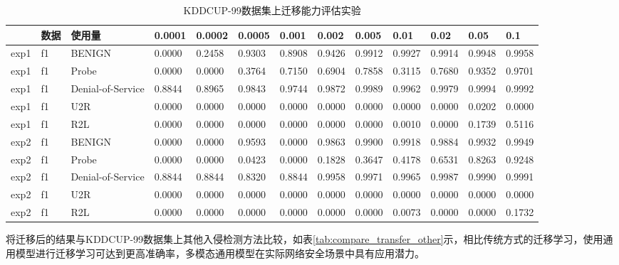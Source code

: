\begin{table}[htbp]
\caption{KDDCUP-99数据集上迁移能力评估实验}
    \centering
    \begin{adjustbox}{max width=\textwidth}
    \begin{tabular}{lllllllllllll}
    \toprule
        ~ & 数据& 使用量& 0.0001 &  0.0002&0.0005& 0.001& 0.002 & 0.005 & 0.01 & 0.02 & 0.05 & 0.1 \\ \midrule
        exp1 & f1& BENIGN& 0.0000 &  0.2458 &0.9303 & 0.8908 & 0.9426 & 0.9912 & 0.9927 & 0.9914 & 0.9948 & 0.9958 
\\ 
        exp1 & f1& Probe& 0.0000 &  0.0000 &0.3764 & 0.7150 & 0.6904 & 0.7858 & 0.3115 & 0.7680 & 0.9352 & 0.9701 
\\
 exp1 & f1& Denial-of-Service& 0.8844 & 0.8965 & 0.9843 & 0.9744 & 0.9872 & 0.9989 & 0.9962 & 0.9979 & 0.9994 &0.9992 
\\
 exp1 & f1& U2R& 0.0000 & 0.0000 & 0.0000 & 0.0000 & 0.0000 & 0.0000 & 0.0000 & 0.0000 & 0.0202 &0.0000 
\\
 exp1 & f1
& R2L& 0.0000 & 0.0000 & 0.0000 & 0.0000 & 0.0000 & 0.0000 & 0.0010 & 0.0000 & 0.1739 &0.5116 
\\
 exp2 & f1& BENIGN& 0.0000 & 0.0000 & 0.9593 & 0.0000 & 0.9863 & 0.9900 & 0.9918 & 0.9884 & 0.9932 &0.9949 
\\
 exp2 & f1
& Probe& 0.0000 & 0.0000 & 0.0423 & 0.0000 & 0.1828 & 0.3647 & 0.4178 & 0.6531 & 0.8263 &0.9248 
\\
 exp2 & f1
& Denial-of-Service& 0.8844 & 0.8844 & 0.8320 & 0.8844 & 0.9958 & 0.9971 & 0.9965 & 0.9987 & 0.9990 &0.9991 
\\
 exp2 & f1& U2R& 0.0000 & 0.0000 & 0.0000 & 0.0000 & 0.0000 & 0.0000 & 0.0000 & 0.0000 & 0.0000 &0.0000 
\\
 exp2 & f1& R2L& 0.0000 & 0.0000 & 0.0000 & 0.0000 & 0.0000 & 0.0000 & 0.0073 & 0.0000 & 0.0000 &0.1732 
\\
    \bottomrule
    \end{tabular}
    \end{adjustbox}
    \label{tab:transfer-exp-f1}
\end{table}

将迁移后的结果与KDDCUP-99数据集上其他入侵检测方法比较，如表\ref{tab:compare_transfer_other}示，相比传统方式的迁移学习，使用通用模型进行迁移学习可达到更高准确率，多模态通用模型在实际网络安全场景中具有应用潜力。

